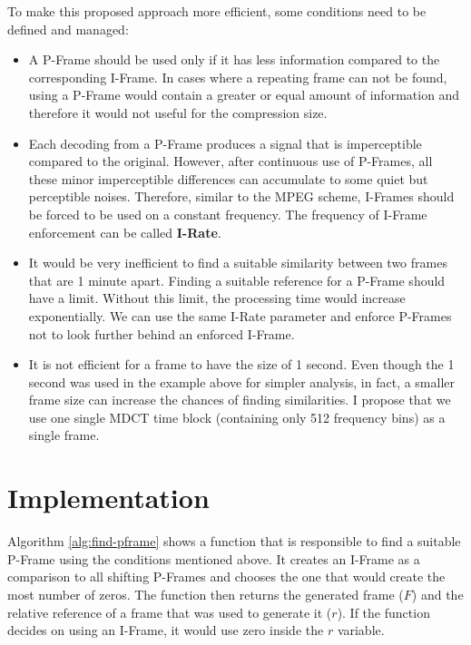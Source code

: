 To make this proposed approach more efficient, some conditions need to be defined and managed:
\begin{itemize}
    \item A P-Frame should be used only if it has less information compared to the corresponding I-Frame. In cases where a repeating frame can not be found, using a P-Frame would contain a greater or equal amount of information and therefore it would not useful for the compression size. 
    \item Each decoding from a P-Frame produces a signal that is imperceptible compared to the original. However, after continuous use of P-Frames, all these minor imperceptible differences can accumulate to some quiet but perceptible noises. Therefore, similar to the MPEG scheme, I-Frames should be forced to be used on a constant frequency. The frequency of I-Frame enforcement can be called \textbf{I-Rate}. 
    \item It would be very inefficient to find a suitable similarity between two frames that are 1 minute apart. Finding a suitable reference for a P-Frame should have a limit. Without this limit, the processing time would increase exponentially. We can use the same I-Rate parameter and enforce P-Frames not to look further behind an enforced I-Frame.
    \item It is not efficient for a frame to have the size of 1 second. Even though the 1 second was used in the example above for simpler analysis, in fact, a smaller frame size can increase the chances of finding similarities. I propose that we use one single MDCT time block (containing only 512 frequency bins) as a single frame.
\end{itemize}

\section{Implementation}
\label{sec:implementation}

Algorithm \ref{alg:find-pframe} shows a function that is responsible to find a suitable P-Frame using the conditions mentioned above. It creates an I-Frame as a comparison to all shifting P-Frames and chooses the one that would create the most number of zeros. The function then returns the generated frame ($F$) and the relative reference of a frame that was used to generate it ($r$). If the function decides on using an I-Frame, it would use zero inside the $r$ variable.


